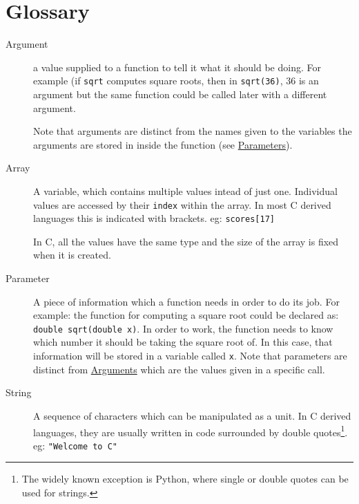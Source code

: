 
\chapter*{Glossary}

\begin{description}
 \item[\hypertarget{defn:argument}{Argument}] a value supplied to a function to tell it what it should be doing.
 For example (if \texttt{sqrt} computes square roots, then in \lstinline{sqrt(36)}, $36$ is an argument but the same function
 could be called later with a different argument.
 
 Note that arguments are distinct from the names given to the variables the arguments are stored in inside the function (see \hyperlink{defn:parameter}{Parameters}).
 \item[\hypertarget{defn:array}{Array}] A variable, which contains multiple values intead of just one. 
 Individual values are accessed by their \texttt{index} within the array.
 In most C derived languages this is indicated with brackets.
 eg:
    \lstinline!scores[17]!
    
 In C, all the values have the same type and the size of the array is fixed 
 when it is created.
 
 \item[\hypertarget{defn:parameter}{Parameter}] A piece of information which a function needs in order to do its job.
 For example: the function for computing a square root could be declared as:
 \lstinline!double sqrt(double x)!.
 In order to work, the function needs to know which number it should be taking the square root of.
 In this case, that information will be stored in a variable called \texttt{x}.
 Note that parameters are distinct from \hyperlink{defn:argument}{Arguments} which are the values given in a specific call.
 
 \item[\hypertarget{defn:string}{String}] A sequence of characters which can be manipulated as a unit.
 In C derived languages, they are usually written in code surrounded by double quotes\footnote{The widely known exception 
 is Python, where single or double quotes can be used for strings.}.
 eg:
 \lstinline!"Welcome to C"!
\end{description}
